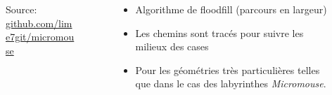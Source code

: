 \appendix
\begin{frame}
\tableofcontents[currentsection]
\end{frame}


\begin{frame}
\begin{columns}
    \begin{column}{.4\textwidth}
        \begin{figure}
            \centering
            \def\stackalignment{r}
               {\sources
                Source: \url{github.com/lime7git/micromouse}}
        \end{figure}
    \end{column}
    \begin{column}{.7\textwidth}
        \begin{itemize}
            \item Algorithme de floodfill (parcours en largeur)
            \item Les chemins sont tracés pour suivre les milieux des cases
            \item Pour les géométries très particulières telles que dans le cas des labyrinthes \textit{Micromouse}.
        \end{itemize}
    \end{column}
\end{columns}
\end{frame}


